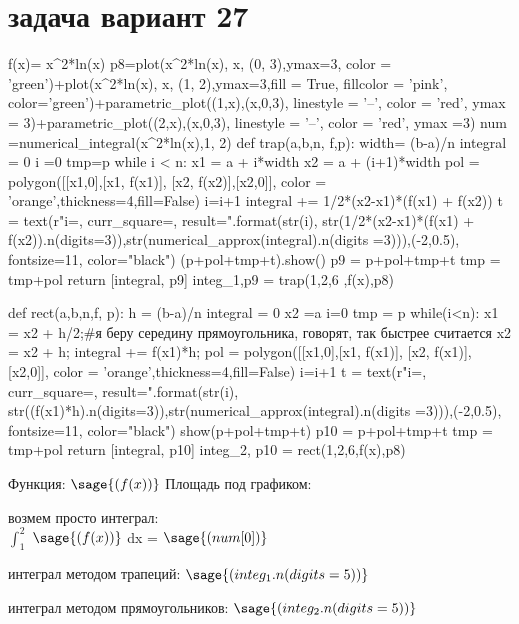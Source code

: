 \section{задача вариант 27}
\begin {sagesilent}
f(x)= x^2*ln(x)
p8=plot(x^2*ln(x), x, (0, 3),ymax=3, color = 'green')+plot(x^2*ln(x), x, (1, 2),ymax=3,fill = True, fillcolor = 'pink', color='green')+parametric_plot((1,x),(x,0,3), linestyle = '--', color = 'red', ymax = 3)+parametric_plot((2,x),(x,0,3), linestyle = '--', color = 'red', ymax =3)
num =numerical_integral(x^2*ln(x),1, 2)
def trap(a,b,n, f,p):
    width= (b-a)/n
    integral = 0
    i =0
    tmp=p
    while i < n:
        x1 = a + i*width
        x2 = a + (i+1)*width
        pol = polygon([[x1,0],[x1, f(x1)], [x2, f(x2)],[x2,0]], color = 'orange',thickness=4,fill=False)
        i=i+1
        integral += 1/2*(x2-x1)*(f(x1) + f(x2))
        t = text(r"i={}, curr_square={}, result={}".format(str(i), str(1/2*(x2-x1)*(f(x1) + f(x2)).n(digits=3)),str(numerical_approx(integral).n(digits =3))),(-2,0.5), fontsize=11, color="black")
        (p+pol+tmp+t).show()
        p9 = p+pol+tmp+t
        tmp = tmp+pol
    return [integral, p9]
integ_1,p9 = trap(1,2,6 ,f(x),p8)

def rect(a,b,n,f, p):
    h = (b-a)/n
    integral = 0
    x2 =a
    i=0
    tmp = p
    while(i<n):
        x1 = x2 + h/2;#я беру середину прямоугольника, говорят, так быстрее считается
        x2 = x2 + h;
        integral += f(x1)*h;
        pol = polygon([[x1,0],[x1, f(x1)], [x2, f(x1)],[x2,0]], color = 'orange',thickness=4,fill=False)
        i=i+1
        t = text(r"i={}, curr_square={}, result={}".format(str(i), str((f(x1)*h).n(digits=3)),str(numerical_approx(integral).n(digits =3))),(-2,0.5), fontsize=11, color="black")
        show(p+pol+tmp+t)
        p10 = p+pol+tmp+t
        tmp = tmp+pol
    return [integral, p10]
integ_2, p10 = rect(1,2,6,f(x),p8)
\end {sagesilent}
Функция: 
\large $\sage{(f(x))}$
Площадь под графиком:\\
\begin{center}
\end{center}
возмем просто интеграл:\\
$\int_{1}^{2}$ $\sage{(f(x))}$
dx = $\sage{(num[0])}$\\
\begin{center}
\end{center}
интеграл методом трапеций:
$\sage{(integ_1.n(digits = 5))}$
\begin{center}
\end{center}
интеграл методом прямоугольников:
$\sage{(integ_2.n(digits = 5))}$

